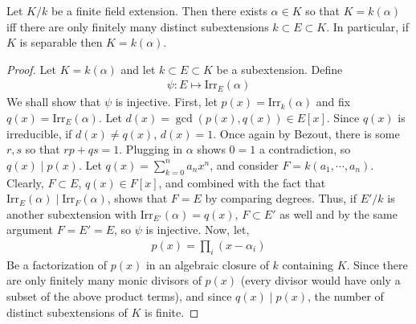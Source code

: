 \documentclass[12pt]{article}
\newenvironment{theorem}{\begin{mytheorem}}{\end{mytheorem}}
\theoremstyle{definitionstyle}
\begin{document}
	\begin{theorem}
		Let $K/k$ be a finite field extension. Then there exists $\alpha \in K$ so that $K = k(\alpha)$ iff there are only finitely many distinct subextensions $k \subset E \subset K$. In particular, if $K$ is separable then $K = k(\alpha)$.
	\end{theorem}
	\begin{proof}
		Let $K = k(\alpha)$ and let $k \subset E \subset K$ be a subextension. Define 
		\begin{align*}
			\psi: E \mapsto \mathrm{Irr}_E(\alpha)
		\end{align*}
		We shall show that $\psi$ is injective. First, let $p(x) = \mathrm{Irr}_k(\alpha)$ and fix $q(x) = \mathrm{Irr}_E(\alpha)$. Let $d(x) = \gcd(p(x), q(x)) \in E[x]$. Since $q(x)$ is irreducible, if $d(x) \neq q(x)$, $d(x) = 1$. Once again by Bezout, there is some $r,s$ so that $rp + qs = 1$. Plugging in $\alpha$ shows $0 = 1$ a contradiction, so $q(x) \mid p(x)$. Let $q(x) = \sum_{k=0}^n a_nx^n$, and consider $F = k(a_1, \cdots, a_n)$. Clearly, $F \subset E$, $q(x) \in F[x]$, and combined with the fact that $\mathrm{Irr}_E(\alpha) \mid \mathrm{Irr}_F(\alpha)$, shows that $F = E$ by comparing degrees. Thus, if $E'/k$ is another subextension with $\mathrm{Irr}_{E'}(\alpha) = q(x)$, $F \subset E'$ as well and by the same argument $F = E' = E$, so $\psi$ is injective. Now, let,
		\begin{align*}
			p(x) = \prod_i (x-\alpha_i)
		\end{align*}
		Be a factorization of $p(x)$ in an algebraic closure of $k$ containing $K$. Since there are only finitely many monic divisors of $p(x)$ (every divisor would have only a subset of the above product terms), and since $q(x) \mid p(x)$, the number of distinct subextensions of $K$ is finite.
		

\end{proof}
\end{document}
